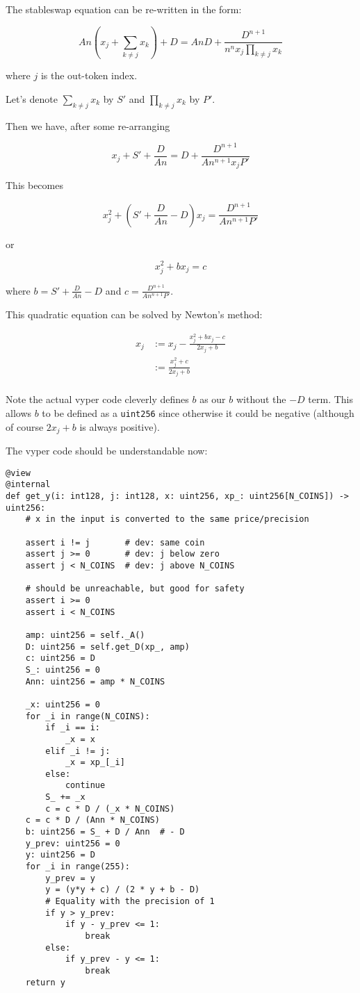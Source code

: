 \documentclass[
]{article}
\begin{document}
The stableswap equation can be re-written in the form:

\[ An\left(x_j + \sum_{k\neq j} x_k\right) + D = AnD + \frac{D^{n+1}}{n^n x_j \prod_{k\neq j} x_k} \]

where \(j\) is the out-token index.

Let's denote \(\sum_{k\neq j} x_k\) by \(S'\) and
\(\prod_{k\neq j} x_k\) by \(P'\).

Then we have, after some re-arranging

\[ x_j + S' + \frac{D}{An} = D + \frac{D^{n+1}}{An^{n+1} x_j P'} \]

This becomes

\[ x_j^2 + \left(S' + \frac{D}{An} - D\right) x_j = \frac{D^{n+1}}{An^{n+1}P'}\]

or

\[ x_j^2 + bx_j = c\]

where \(b = S' + \frac{D}{An} - D\) and
\(c = \frac{D^{n+1}}{An^{n+1}P'}\).

This quadratic equation can be solved by Newton's method:

\[ \begin{aligned}
x_j &:= x_j - \frac{x_j^2 + bx_j - c}{2x_j + b}\\
&:= \frac{x_j^2 + c}{2x_j + b} \\
\end{aligned} \]

Note the actual vyper code cleverly defines \(b\) as our \(b\) without
the \(-D\) term. This allows \(b\) to be defined as a \texttt{uint256}
since otherwise it could be negative (although of course \(2x_j + b\) is
always positive).

The vyper code should be understandable now:

\begin{verbatim}
@view
@internal
def get_y(i: int128, j: int128, x: uint256, xp_: uint256[N_COINS]) -> uint256:
    # x in the input is converted to the same price/precision

    assert i != j       # dev: same coin
    assert j >= 0       # dev: j below zero
    assert j < N_COINS  # dev: j above N_COINS

    # should be unreachable, but good for safety
    assert i >= 0
    assert i < N_COINS

    amp: uint256 = self._A()
    D: uint256 = self.get_D(xp_, amp)
    c: uint256 = D
    S_: uint256 = 0
    Ann: uint256 = amp * N_COINS

    _x: uint256 = 0
    for _i in range(N_COINS):
        if _i == i:
            _x = x
        elif _i != j:
            _x = xp_[_i]
        else:
            continue
        S_ += _x
        c = c * D / (_x * N_COINS)
    c = c * D / (Ann * N_COINS)
    b: uint256 = S_ + D / Ann  # - D
    y_prev: uint256 = 0
    y: uint256 = D
    for _i in range(255):
        y_prev = y
        y = (y*y + c) / (2 * y + b - D)
        # Equality with the precision of 1
        if y > y_prev:
            if y - y_prev <= 1:
                break
        else:
            if y_prev - y <= 1:
                break
    return y
\end{verbatim}
\end{document}
